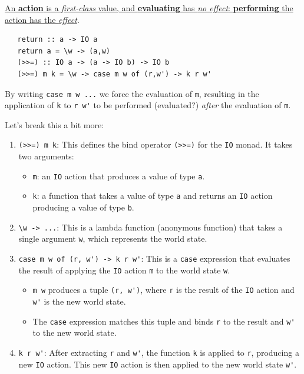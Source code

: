 \ul{An \textbf{action} is a \textit{first-class} value,
and \textbf{evaluating} has \textit{no effect}: \textbf{performing} the
action has the \textit{effect}}.

\begin{lstlisting}
   return :: a -> IO a
   return a = \w -> (a,w)
   (>>=) :: IO a -> (a -> IO b) -> IO b
   (>>=) m k = \w -> case m w of (r,w') -> k r w'
\end{lstlisting}

By writing \lstinline|case m w ...| we force the evaluation of \lstinline|m|,
resulting in the application of \lstinline|k| to \lstinline|r w'| to be performed (evaluated?) \textit{after} the evaluation of \lstinline|m|.  

Let's break this a bit more:
\begin{enumerate}
	\item \lstinline{(>>=) m k}:
   This defines the bind operator \lstinline{(>>=)} for the \lstinline{IO} monad. It takes two arguments:
   \begin{itemize}
     \item \lstinline{m}: an \lstinline{IO} action that produces a value of type \lstinline{a}.
     \item \lstinline{k}: a function that takes a value of type \lstinline{a} and returns an \lstinline{IO} action producing a value of type \lstinline{b}.
   \end{itemize}
	\item \lstinline{\w -> ...}:
   This is a lambda function (anonymous function) that takes a single argument \lstinline{w}, which represents the world state.
	\item \lstinline{case m w of (r, w') -> k r w'}:
   This is a \lstinline{case} expression that evaluates the result of applying the \lstinline{IO} action \lstinline{m} to the world state \lstinline{w}.
   \begin{itemize}
     \item \lstinline{m w} produces a tuple \lstinline{(r, w')}, where \lstinline{r} is the result of the \lstinline{IO} action and \lstinline{w'} is the new world state.
     \item The \lstinline{case} expression matches this tuple and binds \lstinline{r} to the result and \lstinline{w'} to the new world state.
   \end{itemize}
	\item \lstinline{k r w'}:
   After extracting \lstinline{r} and \lstinline{w'}, the function \lstinline{k} is applied to \lstinline{r}, producing a new \lstinline{IO} action.
   This new \lstinline{IO} action is then applied to the new world state \lstinline{w'}.
\end{enumerate}

